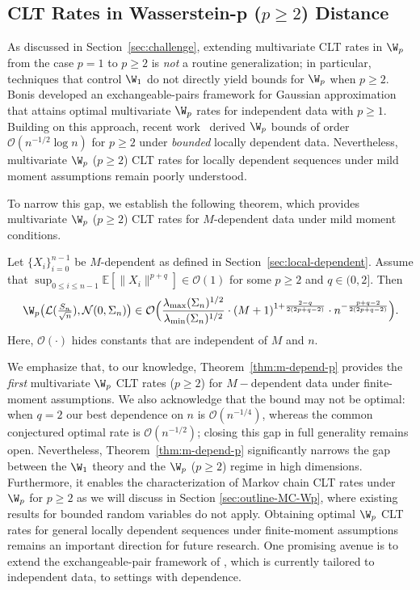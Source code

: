 \documentclass[mnsc,nonblindrev]{informs3}
\begin{document}
\subsection{CLT Rates in Wasserstein-p ($p \geq 2$) Distance}\label{sec:depend-plargethan2}
As discussed in Section~\ref{sec:challenge}, extending multivariate CLT rates in $\W_p$
from the case $p=1$ to $p\ge 2$ is \emph{not} a routine generalization; in particular,
techniques that control $\W_1$ do not directly yield bounds for $\W_p$ when $p\ge 2$.
Bonis \cite[Theorems~4 and~9]{bonis2020stein} developed an exchangeable-pairs framework for
Gaussian approximation that attains optimal multivariate $\W_p$ rates for independent
data with $p\ge 1$. Building on this approach, recent work~\citep{fang2023p} derived $\W_p$ bounds of order $\mathcal{O}(n^{-1/2}\log n)$ for $p\ge 2$ under \emph{bounded} locally dependent data.
Nevertheless, multivariate $\W_p$ ($p\ge 2$) CLT rates for locally dependent sequences
under mild moment assumptions remain poorly understood.


To narrow this gap, we establish the following theorem, which provides multivariate 
$\W_p$ ($p\ge 2$) CLT rates for $M$-dependent data under mild moment conditions.
\begin{theorem}\label{thm:m-depend-p}
Let $\{X_i\}_{i=0}^{n-1}$ be $M$-dependent as defined in Section~\ref{sec:local-dependent}. Assume that $\sup_{0\le i\le n-1}\mathbb{E}\left[\|X_i\|^{p+q}\right]\in \mathcal O(1)$ for some $p \geq 2$ and $q \in(0,2]$. Then
\[
\W_p\big(\mathcal{L}(\tfrac{S_n}{\sqrt{n}}),\mathcal{N}(0,\Sigma_n)\big)
\in \mathcal{O}\Big(
\frac{\lambda_{\max}(\Sigma_n)^{1/2}}{\lambda_{\min}(\Sigma_n)^{1/2}}\cdot
(M+1)^{1+\frac{2-q}{2(2p+q-2)}}\cdot
n^{-\frac{p+q-2}{2(2p+q-2)}}
\Big).
\]
Here, $\mathcal{O}(\cdot)$ hides constants that are independent of $M$ and $n$.
\end{theorem}

We emphasize that, to our knowledge, Theorem~\ref{thm:m-depend-p} provides the \emph{first} multivariate $\W_p$ CLT rates ($p\ge2$) for $M-$dependent data under finite-moment assumptions. We also acknowledge that the bound may not be optimal: when $q=2$ our best dependence on $n$ is $\mathcal{O}(n^{-1/4})$, whereas the common conjectured optimal rate is $\mathcal{O}(n^{-1/2})$; closing this gap in full generality remains open. Nevertheless, Theorem~\ref{thm:m-depend-p} significantly narrows the gap between the $\W_1$ theory and the $\W_p$ ($p\ge2$) regime in high dimensions. Furthermore, it enables the characterization of Markov chain CLT rates under $\W_p$ for $p\ge2$ as we will discuss in Section \ref{sec:outline-MC-Wp}, where existing results for bounded random variables \citep{fang2023p} do not apply. Obtaining optimal $\W_p$ CLT rates for general locally dependent sequences under
finite-moment assumptions remains an important direction for future research. One
promising avenue is to extend the exchangeable-pair framework of
\cite{bonis2020stein}, which is currently tailored to independent data, to
settings with dependence.
\end{document}
